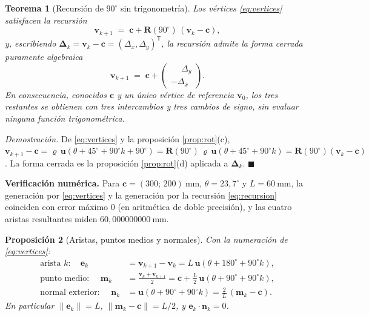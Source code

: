 \documentclass[11pt,a4paper]{article}
\newtheorem{teorema}{Teorema}[section]
\newtheorem{proposicion}[teorema]{Proposición}
\theoremstyle{definition}
\newenvironment{demo}{\par\noindent\textit{Demostración.}\;}{\hfill$\blacksquare$\par\medskip}
\newcommand{\Rot}{\mathbf{R}}
\newcommand{\uu}{\mathbf{u}}
\newcommand{\vv}{\mathbf{v}}
\newcommand{\nn}{\mathbf{n}}
\newcommand{\cc}{\mathbf{c}}
\newcommand{\ee}{\mathbf{e}}
\newcommand{\grados}{^{\circ}}
\begin{document}
\begin{teorema}[Recursión de $90\grados$ sin trigonometría]
\label{teo:recursion}
Los vértices \eqref{eq:vertices} satisfacen la recursión
\begin{equation}
  \vv_{k+1} \;=\; \cc + \Rot(90\grados)\,(\vv_k - \cc),
\end{equation}
y, escribiendo $\boldsymbol\Delta_k = \vv_k - \cc = (\Delta_x, \Delta_y)^{\mathsf T}$, la
recursión admite la forma cerrada puramente algebraica
\begin{equation}
  \boxed{\
  \vv_{k+1} \;=\; \cc +
  \begin{pmatrix} \phantom{-}\Delta_y \\ -\Delta_x \end{pmatrix}. \ }
  \label{eq:recursion}
\end{equation}
En consecuencia, conocidos $\cc$ y \emph{un único} vértice de referencia $\vv_0$, los
tres restantes se obtienen con tres intercambios y tres cambios de signo, sin evaluar
ninguna función trigonométrica.
\end{teorema}

\begin{demo}
De \eqref{eq:vertices} y la proposición \ref{prop:rot}(c),
$\vv_{k+1} - \cc = \varrho\,\uu(\theta+45\grados+90\grados k + 90\grados)
= \Rot(90\grados)\,\varrho\,\uu(\theta+45\grados+90\grados k) = \Rot(90\grados)(\vv_k - \cc)$.
La forma cerrada es la proposición \ref{prop:rot}(d) aplicada a $\boldsymbol\Delta_k$.
\end{demo}

\begin{resultado}
\textbf{Verificación numérica.} Para $\cc = (300;\,200)\ \mathrm{mm}$,
$\theta = 23{,}7\grados$ y $L=60\ \mathrm{mm}$, la generación por
\eqref{eq:vertices} y la generación por la recursión \eqref{eq:recursion} coinciden con
error máximo $0$ (en aritmética de doble precisión), y las cuatro aristas resultantes
miden $60{,}000000000\ \mathrm{mm}$.
\end{resultado}

\begin{proposicion}[Aristas, puntos medios y normales]
\label{prop:aristas}
Con la numeración de \eqref{eq:vertices}:
\begin{align}
  \text{arista } k: \quad
  \ee_k &= \vv_{k+1} - \vv_k = L\,\uu\!\left(\theta + 180\grados + 90\grados k\right),
  \label{eq:arista}\\[3pt]
  \text{punto medio: } \quad
  \mathbf m_k &= \frac{\vv_k + \vv_{k+1}}{2}
   = \cc + \frac{L}{2}\,\uu\!\left(\theta + 90\grados + 90\grados k\right),
  \label{eq:puntomedio}\\[3pt]
  \text{normal exterior: } \quad
  \nn_k &= \uu\!\left(\theta + 90\grados + 90\grados k\right)
   = \frac{2}{L}\,(\mathbf m_k - \cc).
  \label{eq:normal}
\end{align}
En particular $\|\ee_k\| = L$, $\|\mathbf m_k - \cc\| = L/2$, y
$\ee_k \cdot \nn_k = 0$.
\end{proposicion}
\end{document}
